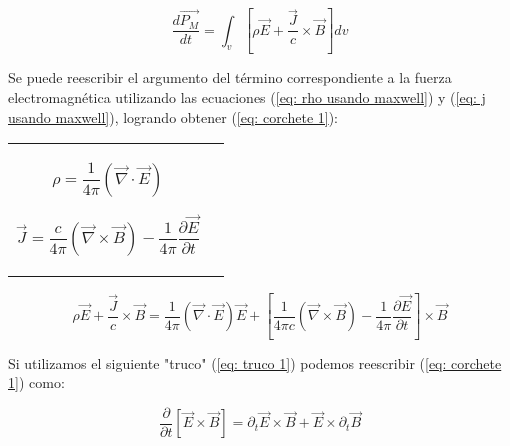 \documentclass[]{article}
\begin{document}
\begin{equation}
    \frac{d\vec{P_{M}}}{dt} = \int_{v}^{} [\rho \vec{E} + \frac{\vec{J}}{c} \times \vec{B}] dv
    \label{eq: Newton}
\end{equation}

Se puede reescribir el argumento del término correspondiente a la fuerza electromagnética utilizando
las ecuaciones (\ref{eq: rho usando maxwell}) y (\ref{eq: j usando maxwell}), logrando obtener 
(\ref{eq: corchete 1}):

\begin{table}[h]
\begin{tabular}{cc}

\begin{minipage}{0.4\textwidth}
\begin{equation}
    \rho = \frac{1}{4 \pi} (\vec{\nabla} \cdot \vec{E})
    \label{eq: rho usando maxwell}
\end{equation}
\end{minipage}

\quad

\begin{minipage}{0.4\textwidth}
\begin{equation}
    \vec{J} = \frac{c}{4 \pi} (\vec{\nabla} \times \vec{B}) - \frac{1}{4 \pi} \frac{\partial \vec{E}}{\partial t}
    \label{eq: j usando maxwell}
\end{equation}
\end{minipage}

\end{tabular}
\end{table}

\begin{equation}
    \rho \vec{E} + \frac{\vec{J}}{c} \times \vec{B} = \frac{1}{4 \pi} (\vec{\nabla} \cdot \vec{E}) \vec{E} + 
    \left[ 
        \frac{1}{4 \pi c} (\vec{\nabla} \times \vec{B}) - \frac{1}{4 \pi} \frac{\partial \vec{E}}{\partial t}
    \right] \times \vec{B}
    \label{eq: corchete 1}
\end{equation}

Si utilizamos el siguiente "truco" (\ref{eq: truco 1}) podemos reescribir (\ref{eq: corchete 1}) como:


\begin{equation}
    \frac{\partial}{\partial t} \left[
        \vec{E} \times \vec{B}
    \right] =
    \partial_t \vec{E} \times \vec{B} + \vec{E} \times \partial_t \vec{B}
    \label{eq: truco 1}
\end{equation}
\end{document}
